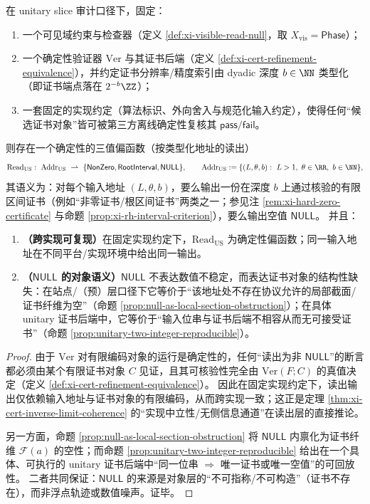\begin{theorem}\label{thm:xi-us-deterministic-tristate}
在 unitary slice 审计口径下，固定：
\begin{enumerate}
  \item 一个可见域约束与检查器（定义 \ref{def:xi-visible-read-null}，取 \(X_{\mathrm{vis}}=\mathsf{Phase}\)）；
  \item 一个确定性验证器 \(\mathrm{Ver}\) 与其证书后端（定义 \ref{def:xi-cert-refinement-equivalence}），并约定证书分辨率/精度索引由 dyadic 深度 \(b\in\NN\) 类型化（即证书端点落在 \(2^{-b}\ZZ\)）；
  \item 一套固定的实现约定（算法标识、外向舍入与规范化输入约定），使得任何“候选证书对象”皆可被第三方离线确定性复核其 \(\mathsf{pass}/\mathsf{fail}\)。
\end{enumerate}
则存在一个确定性的三值偏函数（按类型化地址的读出）
\[
\mathrm{Read}_{\mathrm{US}}:\ \mathrm{Addr}_{\mathrm{US}}\ \rightharpoonup\ \{\mathsf{NonZero},\mathsf{RootInterval},\mathsf{NULL}\},
\qquad
\mathrm{Addr}_{\mathrm{US}}:=\{(L,\theta,b):\ L>1,\ \theta\in\RR,\ b\in\NN\},
\]
其语义为：对每个输入地址 \((L,\theta,b)\)，要么输出一份在深度 \(b\) 上通过核验的有限区间证书（例如“非零证书/根区间证书”两类之一；参见注 \ref{rem:xi-hard-zero-certificate} 与命题 \ref{prop:xi-rh-interval-criterion}），要么输出空值 \(\mathsf{NULL}\)。
并且：
\begin{enumerate}
  \item \textbf{（跨实现可复现）}在固定实现约定下，\(\mathrm{Read}_{\mathrm{US}}\) 为确定性偏函数；同一输入地址在不同平台/实现环境中给出同一输出。
  \item \textbf{（\(\mathsf{NULL}\) 的对象语义）}\(\mathsf{NULL}\) 不表达数值不稳定，而表达证书对象的结构性缺失：在站点/（预）层口径下它等价于“该地址处不存在协议允许的局部截面/证书纤维为空”（命题 \ref{prop:null-as-local-section-obstruction}）；在具体 unitary 证书后端中，它等价于“输入位串与证书后端不相容从而无可接受证书”（命题 \ref{prop:unitary-two-integer-reproducible}）。
\end{enumerate}
\end{theorem}

\begin{proof}
由于 \(\mathrm{Ver}\) 对有限编码对象的运行是确定性的，任何“读出为非 \(\mathsf{NULL}\)”的断言都必须由某个有限证书对象 \(C\) 见证，且其可核验性完全由 \(\mathrm{Ver}(F;C)\) 的真值决定（定义 \ref{def:xi-cert-refinement-equivalence}）。
因此在固定实现约定下，读出输出仅依赖输入地址与证书对象的有限编码，从而跨实现一致；这正是定理 \ref{thm:xi-cert-inverse-limit-coherence} 的“实现中立性/无侧信息通道”在读出层的直接推论。
\par
另一方面，命题 \ref{prop:null-as-local-section-obstruction} 将 \(\mathsf{NULL}\) 内禀化为证书纤维 \(\mathscr F(a)\) 的空性；而命题 \ref{prop:unitary-two-integer-reproducible} 给出在一个具体、可执行的 unitary 证书后端中“同一位串 \(\Rightarrow\) 唯一证书或唯一空值”的可回放性。
二者共同保证：\(\mathsf{NULL}\) 的来源是对象层的“不可指称/不可构造”（证书不存在），而非浮点轨迹或数值噪声。证毕。
\end{proof}

